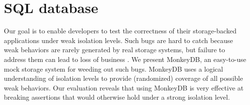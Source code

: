 
\section{SQL database}
\label{sec:conc}

Our goal is to enable developers to test the correctness of their storage-backed applications under 
weak isolation levels. Such bugs are hard to catch because weak behaviors are
rarely generated by real storage systems, but failure to address them can lead
to loss of business \cite{DBLP:conf/sigmod/WarszawskiB17}. We present MonkeyDB, an easy-to-use mock storage system
for weeding out such bugs. MonkeyDB uses a logical understanding of isolation
levels to provide (randomized) coverage of all possible weak behaviors. Our evaluation reveals that
using MonkeyDB is very effective at breaking assertions that would otherwise
hold under a strong isolation level.


